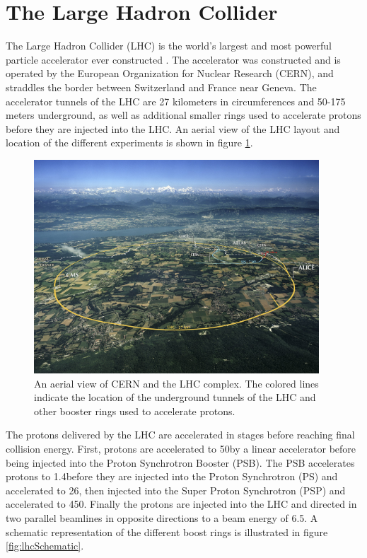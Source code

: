 \section{The Large Hadron Collider}
\label{sec:lhc}

The Large Hadron Collider (LHC) is the world's largest and most powerful particle accelerator ever constructed \cite{Evans:2008zzb}. The accelerator was constructed and is operated by the European Organization for Nuclear Research (CERN), and straddles the border between Switzerland and France near Geneva. The accelerator tunnels of the LHC are 27 kilometers in circumferences and 50-175 meters underground, as well as additional smaller rings used to accelerate protons before they are injected into the LHC. An aerial view of the LHC layout and location of the different experiments is shown in figure \ref{fig:lhcAerial}.

\begin{figure}
	\centering
	\includegraphics[width=0.95\textwidth]{detector/figs/2048px-CERN_Aerial_View.jpg}
	\renewcommand{\baselinestretch}{1.0}
	\caption[An aerial view of CERN and the LHC complex.]{An aerial view of CERN and the LHC complex. The colored lines indicate the location of the underground tunnels of the LHC and other booster rings used to accelerate protons. \cite{cc}}
	\label{fig:lhcAerial}
\end{figure}

The protons delivered by the LHC are accelerated in stages before reaching final collision energy. First, protons are accelerated to 50\MeV by a linear accelerator before being injected into the Proton Synchrotron Booster (PSB). The PSB accelerates protons to 1.4\GeV before they are injected into the Proton Synchrotron (PS) and accelerated to 26\GeV, then injected into the Super Proton Synchrotron (PSP) and accelerated to 450\GeV. Finally the protons are injected into the LHC and directed in two parallel beamlines in opposite directions to a beam energy of 6.5\TeV. A schematic representation of the different boost rings is illustrated in figure \ref{fig:lhcSchematic}. 


